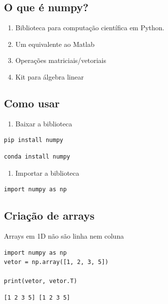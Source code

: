 \documentclass[presentation]{beamer}
\begin{document}
\subsection{O que é numpy?}
\label{sec:orgheadline5}

\begin{enumerate}
\item Biblioteca para computação científica em Python.
\item Um equivalente ao Matlab
\item Operações matriciais/vetoriais
\item Kit para álgebra linear
\end{enumerate}

\subsection{Como usar}
\label{sec:orgheadline6}

\begin{enumerate}
\item Baixar a biblioteca
\end{enumerate}

\begin{verbatim}
pip install numpy
\end{verbatim}

\begin{verbatim}
conda install numpy
\end{verbatim}

\begin{enumerate}
\item Importar a biblioteca
\end{enumerate}

\begin{verbatim}
import numpy as np
\end{verbatim}

\subsection{Criação de arrays}
\label{sec:orgheadline7}

Arrays em 1D não são linha nem coluna
\begin{verbatim}
import numpy as np
vetor = np.array([1, 2, 3, 5])

print(vetor, vetor.T)
\end{verbatim}

\begin{verbatim}
[1 2 3 5] [1 2 3 5]
\end{verbatim}
\end{document}
